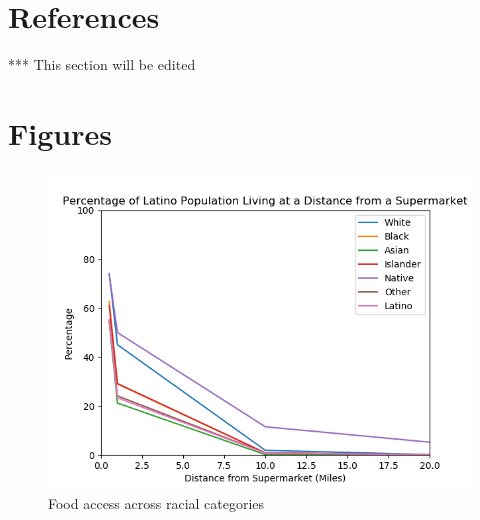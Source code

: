 \documentclass[letterpaper]{article} %
\begin{document}
\newpage
\section{References}

*** This section will be edited 


\newpage
\section{Figures}

\begin{figure}[h] 
	\caption{Food access across racial categories \label{fig:race}}
	\centering
	\includegraphics[width=.6\paperwidth]{Figure_1.png}
\end{figure}
\end{document}
